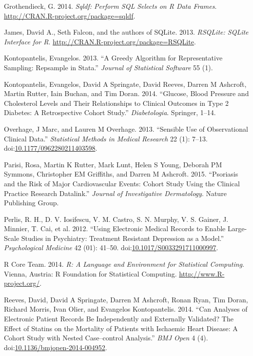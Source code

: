 \documentclass[]{article}
\begin{document}
Grothendieck, G. 2014. \emph{Sqldf: Perform SQL Selects on R Data
Frames}. \url{http://CRAN.R-project.org/package=sqldf}.

James, David A., Seth Falcon, and the authors of SQLite. 2013.
\emph{RSQLite: SQLite Interface for R}.
\url{http://CRAN.R-project.org/package=RSQLite}.

Kontopantelis, Evangelos. 2013. ``A Greedy Algorithm for Representative
Sampling: Repsample in Stata.'' \emph{Journal of Statistical Software}
55 (1).

Kontopantelis, Evangelos, David A Springate, David Reeves, Darren M
Ashcroft, Martin Rutter, Iain Buchan, and Tim Doran. 2014. ``Glucose,
Blood Pressure and Cholesterol Levels and Their Relationships to
Clinical Outcomes in Type 2 Diabetes: A Retrospective Cohort Study.''
\emph{Diabetologia}. Springer, 1--14.

Overhage, J Marc, and Lauren M Overhage. 2013. ``Sensible Use of
Observational Clinical Data.'' \emph{Statistical Methods in Medical
Research} 22 (1): 7--13.
doi:\href{http://dx.doi.org/10.1177/0962280211403598}{10.1177/0962280211403598}.

Parisi, Rosa, Martin K Rutter, Mark Lunt, Helen S Young, Deborah PM
Symmons, Christopher EM Griffiths, and Darren M Ashcroft. 2015.
``Psoriasis and the Risk of Major Cardiovascular Events: Cohort Study
Using the Clinical Practice Research Datalink.'' \emph{Journal of
Investigative Dermatology}. Nature Publishing Group.

Perlis, R. H., D. V. Iosifescu, V. M. Castro, S. N. Murphy, V. S.
Gainer, J. Minnier, T. Cai, et al. 2012. ``Using Electronic Medical
Records to Enable Large-Scale Studies in Psychiatry: Treatment Resistant
Depression as a Model.'' \emph{Psychological Medicine} 42 (01): 41--50.
doi:\href{http://dx.doi.org/10.1017/S0033291711000997}{10.1017/S0033291711000997}.

R Core Team. 2014. \emph{R: A Language and Environment for Statistical
Computing}. Vienna, Austria: R Foundation for Statistical Computing.
\url{http://www.R-project.org/}.

Reeves, David, David A Springate, Darren M Ashcroft, Ronan Ryan, Tim
Doran, Richard Morris, Ivan Olier, and Evangelos Kontopantelis. 2014.
``Can Analyses of Electronic Patient Records Be Independently and
Externally Validated? The Effect of Statins on the Mortality of Patients
with Ischaemic Heart Disease: A Cohort Study with Nested Case--control
Analysis.'' \emph{BMJ Open} 4 (4).
doi:\href{http://dx.doi.org/10.1136/bmjopen-2014-004952}{10.1136/bmjopen-2014-004952}.
\end{document}
